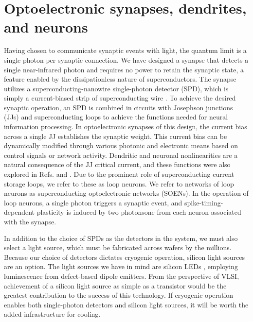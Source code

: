 \documentclass[twocolumn]{article}
\newcommand{\onlinecite}[1]{\hspace{-1 ex} \nocite{#1}\citenum{#1}}
\begin{document}
\section{\label{sec:synapsesDendritesAndNeurons}Optoelectronic synapses, dendrites, and neurons}
Having chosen to communicate synaptic events with light, the quantum limit is a single photon per synaptic connection. We have designed a synapse \cite{sh2018,sh2019_fluxonic} that detects a single near-infrared photon and requires no power to retain the synaptic state, a feature enabled by the dissipationless nature of superconductors. The synapse utilizes a superconducting-nanowire single-photon detector (SPD), which is simply a current-biased strip of superconducting wire \cite{mave2013}. To achieve the desired synaptic operation, an SPD is combined in circuits with Josephson junctions (JJs) and superconducting loops to achieve the functions needed for neural information processing. In optoelectronic synapses of this design, the current bias across a single JJ establishes the synaptic weight. This current bias can be dynamically modified through various photonic and electronic means based on control signals or network activity. Dendritic and neuronal nonlinearities are a natural consequence of the JJ critical current, and these functions were also explored in Refs. \onlinecite{sh2018} and \onlinecite{sh2019_fluxonic}. Due to the prominent role of superconducting current storage loops, we refer to these as loop neurons. We refer to networks of loop neurons as superconducting optoelectronic networks (SOENs). In the operation of loop neurons, a single photon triggers a synaptic event, and spike-timing-dependent plasticity is induced by two photons\textemdash one from each neuron associated with the synapse.

In addition to the choice of SPDs as the detectors in the system, we must also select a light source, which must be fabricated across wafers by the millions. Because our choice of detectors dictates cryogenic operation, silicon light sources are an option. The light sources we have in mind are silicon LEDs \cite{buch2017}, employing luminescence from defect-based dipole emitters. From the perspective of VLSI, achievement of a silicon light source as simple as a transistor would be the greatest contribution to the success of this technology. If cryogenic operation enables both single-photon detectors and silicon light sources, it will be worth the added infrastructure for cooling.
\end{document}
